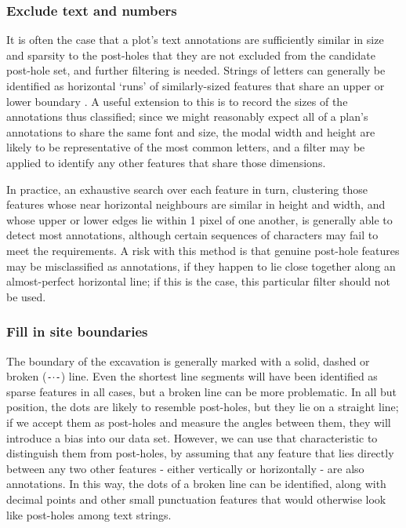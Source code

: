 \documentclass[../../ArchStats.tex]{subfiles}
\begin{document}
\subsubsection{Exclude text and numbers}

It is often the case that a plot's text annotations are sufficiently similar in size and sparsity to the post-holes that they are not excluded from the candidate post-hole set, and further filtering is needed. Strings of letters can generally be identified as horizontal `runs' of similarly-sized features that share an upper or lower boundary . A useful extension to this is to record the sizes of the annotations thus classified; since we might reasonably expect all of a plan's annotations to share the same font and size, the modal width and height are likely to be representative of the most common letters, and a filter may be applied to identify any other features that share those dimensions. 

In practice, an exhaustive search over each feature in turn, clustering those features whose near horizontal neighbours are similar in height and width, and whose upper or lower edges lie within 1 pixel of one another, is generally able to detect most annotations, although certain sequences of characters may fail to meet the requirements. A risk with this method is that genuine post-hole features may be misclassified as annotations, if they happen to lie close together along an almost-perfect horizontal line; if this is the case, this particular filter should not be used. 


\subsubsection{Fill in site boundaries}

The boundary of the excavation is generally marked with a solid, dashed or broken (\texttt{-$\cdot$-}) line. Even the shortest line segments will have been identified as sparse features in all cases, but a broken line can be more problematic. In all but position, the dots are likely to resemble post-holes, but they lie on a straight line; if we accept them as post-holes and measure the angles between them, they will introduce a bias into our data set. However, we can use that characteristic to distinguish them from post-holes, by assuming that any feature that lies directly between any two other features - either vertically or horizontally - are also annotations. In this way, the dots of a broken line can be identified, along with decimal points and other small punctuation features that would otherwise look like post-holes among text strings.
\end{document}
